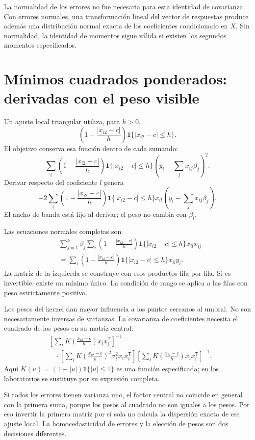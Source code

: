 \documentclass[11pt,a4paper]{article}
\newcommand{\T}{^{\mathsf T}}
\begin{document}
La normalidad de los errores no fue necesaria
para esta identidad de covarianza.
Con errores normales, una transformación lineal del
vector de respuestas produce además una distribución
normal exacta de los coeficientes condicionado en \(X\).
Sin normalidad, la identidad de momentos sigue válida
si existen los segundos momentos especificados.

\clearpage
\section{Mínimos cuadrados ponderados: derivadas con el peso visible}\label{unidad11}
Un ajuste local triangular utiliza, para \(h>0\),
\[
\left(1-\frac{|x_{i2}-c|}{h}\right)
\mathbf1\{|x_{i2}-c|\le h\}.
\]
El objetivo conserva esa función dentro de cada sumando:
\[
\sum_i
\left(1-\frac{|x_{i2}-c|}{h}\right)\mathbf1\{|x_{i2}-c|\le h\}
\left(y_i-\sum_jx_{ij}\beta_j\right)^2.
\]
Derivar respecto del coeficiente \(l\) genera
\[
-2\sum_i
\left(1-\frac{|x_{i2}-c|}{h}\right)\mathbf1\{|x_{i2}-c|\le h\}
x_{il}\left(y_i-\sum_jx_{ij}\beta_j\right).
\]
El ancho de banda está fijo al derivar;
el peso no cambia con \(\beta_l\).

Las ecuaciones normales completas son
\[
\begin{aligned}
&\sum_{j=1}^k\beta_j
\sum_i\left(1-\frac{|x_{i2}-c|}{h}\right)
\mathbf1\{|x_{i2}-c|\le h\}x_{il}x_{ij}\\
&=\sum_i\left(1-\frac{|x_{i2}-c|}{h}\right)
\mathbf1\{|x_{i2}-c|\le h\}x_{il}y_i.
\end{aligned}
\]
La matriz de la izquierda se construye
con esos productos fila por fila.
Si es invertible, existe un mínimo único.
La condición de rango se aplica a las filas
con peso estrictamente positivo.

Los pesos del kernel dan mayor influencia a los puntos
cercanos al umbral. No son necesariamente inversas
de varianzas. La covarianza de coeficientes necesita
el cuadrado de los pesos en su matriz central:
\[
\begin{aligned}
&\left[\sum_i K\left(\frac{x_{i2}-c}{h}\right)x_ix_i\T\right]^{-1}\\
&\quad\cdot
\left[\sum_i K\left(\frac{x_{i2}-c}{h}\right)^2\sigma_i^2x_ix_i\T\right]
\left[\sum_i K\left(\frac{x_{i2}-c}{h}\right)x_ix_i\T\right]^{-1}.
\end{aligned}
\]
Aquí \(K(u)=(1-|u|)\mathbf1\{|u|\le1\}\)
es una función especificada; en los laboratorios
se sustituye por su expresión completa.

Si todos los errores tienen varianza uno,
el factor central no coincide en general
con la primera suma, porque los pesos al cuadrado
no son iguales a los pesos.
Por eso invertir la primera matriz por sí sola
no calcula la dispersión exacta de ese ajuste local.
La homocedasticidad de errores y la elección
de pesos son dos decisiones diferentes.
\end{document}
